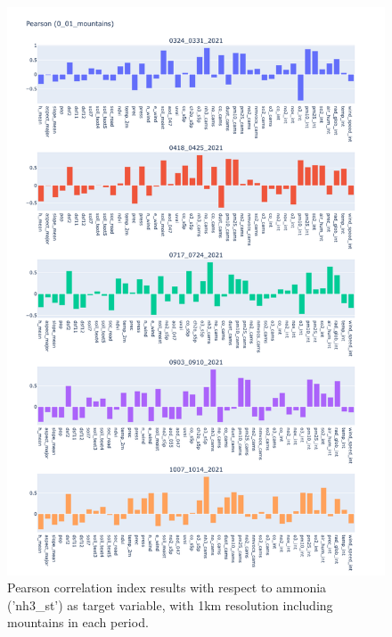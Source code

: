 \begin{figure}[H]
    \centering
    \includegraphics[scale=0.38]{images/tests/0_01_mountainsnh3_st_pearson.png}
    \caption{Pearson correlation index results with respect to ammonia ('nh3\_st') as target variable, with 1km resolution including mountains in each period.}
    
\end{figure}
